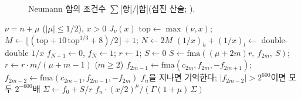 \begin{figure}[htbp]
\centering
{}
\caption{Neumann 합의 조건수 $\sum|\text{항}|/|\text{합}|$(십진 산술; ).}
\label{fig:neumann}
\end{figure}

\begin{algorithm}[htbp]
\begin{algorithmic}[1]
\Require $\nu=n+\mu$ ($|\mu|\le1/2$), $x>0$
\Ensure $J_\nu(x)$
\State $\mathrm{top}\gets\max(\nu,x)$; $M\gets\lfloor(\mathrm{top}+10\,\mathrm{top}^{1/3}+8)/2\rfloor+1$; $N\gets2M$
\State $(1/x)_h+(1/x)_l\gets$ double-double $1/x$ 
\State $f_{N+1}\gets0$, $f_N\gets1$; $r\gets1$; $S\gets0$
 
  \State $S\gets\mathrm{fma}((\mu+2m)r,\ f_{2m},\ S)$; $r\gets r\cdot m/(\mu+m-1)$ ($m\ge2$) 
  \State $f_{2m-1}\gets\mathrm{fma}(c_{2m},f_{2m},-f_{2m+1})$; $f_{2m-2}\gets\mathrm{fma}(c_{2m-1},f_{2m-1},-f_{2m})$ 
  \State $f_n$을 지나면 기억한다; $|f_{2m-2}|>2^{600}$이면 모두 $2^{-600}$배
\EndFor
\State $\Sigma\gets f_0+S/r$ 
\State \Return $f_n\cdot(x/2)^\mu/(\Gamma(1+\mu)\,\Sigma)$
\end{algorithmic}
\caption{Neumann 합으로 정규화한 Miller 방법 (stardust 의 , )}
\label{alg:miller-bessel}
\end{algorithm}

